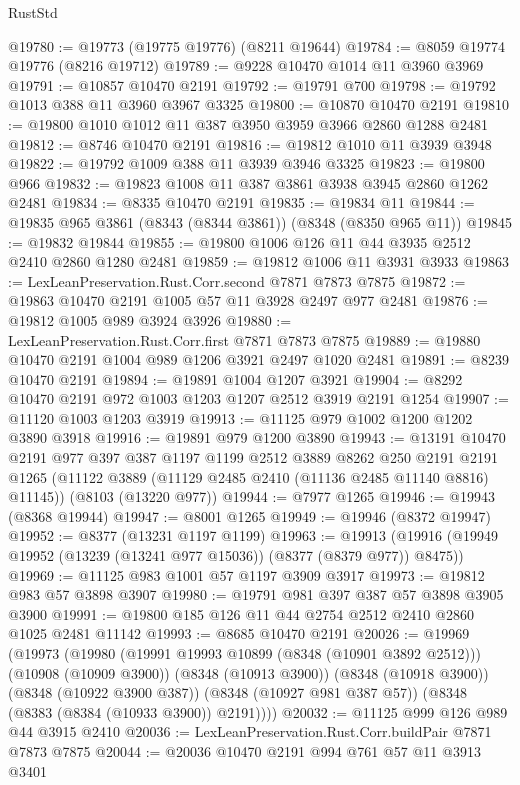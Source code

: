 \begin{lexlean}{RustStd}
\begin{coremodule}
@19780 := @19773 (@19775 @19776) (@8211 @19644)
@19784 := @8059 @19774 @19776 (@8216 @19712)
@19789 := @9228 @10470 @1014 @11 @3960 @3969
@19791 := @10857 @10470 @2191
@19792 := @19791 @700
@19798 := @19792 @1013 @388 @11 @3960 @3967 @3325
@19800 := @10870 @10470 @2191
@19810 := @19800 @1010 @1012 @11 @387 @3950 @3959 @3966 @2860 @1288 @2481
@19812 := @8746 @10470 @2191
@19816 := @19812 @1010 @11 @3939 @3948
@19822 := @19792 @1009 @388 @11 @3939 @3946 @3325
@19823 := @19800 @966
@19832 := @19823 @1008 @11 @387 @3861 @3938 @3945 @2860 @1262 @2481
@19834 := @8335 @10470 @2191
@19835 := @19834 @11
@19844 := @19835 @965 @3861 (@8343 (@8344 @3861)) (@8348 (@8350 @965 @11))
@19845 := @19832 @19844
@19855 := @19800 @1006 @126 @11 @44 @3935 @2512 @2410 @2860 @1280 @2481
@19859 := @19812 @1006 @11 @3931 @3933
@19863 := LexLeanPreservation.Rust.Corr.second @7871 @7873 @7875
@19872 := @19863 @10470 @2191 @1005 @57 @11 @3928 @2497 @977 @2481
@19876 := @19812 @1005 @989 @3924 @3926
@19880 := LexLeanPreservation.Rust.Corr.first @7871 @7873 @7875
@19889 := @19880 @10470 @2191 @1004 @989 @1206 @3921 @2497 @1020 @2481
@19891 := @8239 @10470 @2191
@19894 := @19891 @1004 @1207 @3921
@19904 := @8292 @10470 @2191 @972 @1003 @1203 @1207 @2512 @3919 @2191 @1254
@19907 := @11120 @1003 @1203 @3919
@19913 := @11125 @979 @1002 @1200 @1202 @3890 @3918
@19916 := @19891 @979 @1200 @3890
@19943 := @13191
    @10470
    @2191
    @977
    @397
    @387
    @1197
    @1199
    @2512
    @3889
    @8262
    @250
    @2191
    @2191
    @1265
    (@11122 @3889 (@11129 @2485 @2410 (@11136 @2485 @11140 @8816) @11145))
    (@8103 (@13220 @977))
@19944 := @7977 @1265
@19946 := @19943 (@8368 @19944)
@19947 := @8001 @1265
@19949 := @19946 (@8372 @19947)
@19952 := @8377 (@13231 @1197 @1199)
@19963 := @19913 (@19916 (@19949 @19952 (@13239 (@13241 @977 @15036)) (@8377 (@8379 @977)) @8475))
@19969 := @11125 @983 @1001 @57 @1197 @3909 @3917
@19973 := @19812 @983 @57 @3898 @3907
@19980 := @19791 @981 @397 @387 @57 @3898 @3905 @3900
@19991 := @19800 @185 @126 @11 @44 @2754 @2512 @2410 @2860 @1025 @2481 @11142
@19993 := @8685 @10470 @2191
@20026 := @19969
    (@19973
      (@19980
        (@19991 @19993 @10899 (@8348 (@10901 @3892 @2512)))
        (@10908 (@10909 @3900))
        (@8348 (@10913 @3900))
        (@8348 (@10918 @3900))
        (@8348 (@10922 @3900 @387))
        (@8348 (@10927 @981 @387 @57))
        (@8348 (@8383 (@8384 (@10933 @3900)) @2191))))
@20032 := @11125 @999 @126 @989 @44 @3915 @2410
@20036 := LexLeanPreservation.Rust.Corr.buildPair @7871 @7873 @7875
@20044 := @20036 @10470 @2191 @994 @761 @57 @11 @3913 @3401

\end{coremodule}
\end{lexlean}
